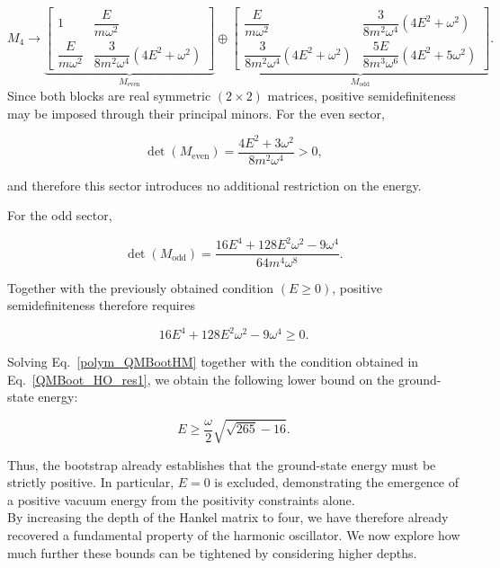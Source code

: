 \documentclass{article}
\theoremstyle{definition}
\begin{document}
\begin{equation}
M_{4} \longrightarrow 
\underbrace{
\begin{bmatrix}
1 &  \dfrac{E}{m\omega^{2}} \\[2mm]
\dfrac{E}{m\omega^{2}} &
\dfrac{3}{8m^{2}\omega^{4}}
\left(4E^{2}+\omega^{2}\right)
\end{bmatrix}
}_{M_{\mathrm{even}}}
\oplus
\underbrace{
\begin{bmatrix}
\dfrac{E}{m\omega^{2}} &
\dfrac{3}{8m^{2}\omega^{4}}
\left(4E^{2}+\omega^{2}\right) \\[2mm]
\dfrac{3}{8m^{2}\omega^{4}}
\left(4E^{2}+\omega^{2}\right) &
\dfrac{5E}{8m^{3}\omega^{6}}
\left(4E^{2}+5\omega^{2}\right)
\end{bmatrix}
}_{M_{\mathrm{odd}}}.
\end{equation}
Since both blocks are real symmetric $(2\times2)$ matrices, positive semidefiniteness may be imposed through their principal minors. For the even sector,

\begin{equation}
\det(M_{\mathrm{even}})
=
\frac{4E^{2}+3\omega^{2}}
{8m^{2}\omega^{4}}
>0,
\end{equation}

and therefore this sector introduces no additional restriction on the energy.

For the odd sector,

\begin{equation}
\det(M_{\mathrm{odd}})
=
\frac{
16E^{4}
+128E^{2}\omega^{2}
-9\omega^{4}
}
{64m^{4}\omega^{8}}.
\end{equation}

Together with the previously obtained condition $(E\geq0)$, positive semidefiniteness therefore requires

\begin{equation}\label{polym_QMBootHM}
16E^{4}
+128E^{2}\omega^{2}
-9\omega^{4}
\geq 0.
\end{equation}

Solving Eq.~\eqref{polym_QMBootHM} together with the condition obtained in Eq.~\eqref{QMBoot_HO_res1}, we obtain the following lower bound on the ground-state energy:

\begin{equation}
    E \geq \frac{\omega}{2}
    \sqrt{\sqrt{265}-16}.
\end{equation}

Thus, the bootstrap already establishes that the ground-state energy must be strictly positive. In particular, \(E=0\) is excluded, demonstrating the emergence of a positive vacuum energy from the positivity constraints alone. \\
By increasing the depth of the Hankel matrix to four, we have therefore already recovered a fundamental property of the harmonic oscillator.
We now explore how much further these bounds can be tightened by considering higher depths.
\end{document}
